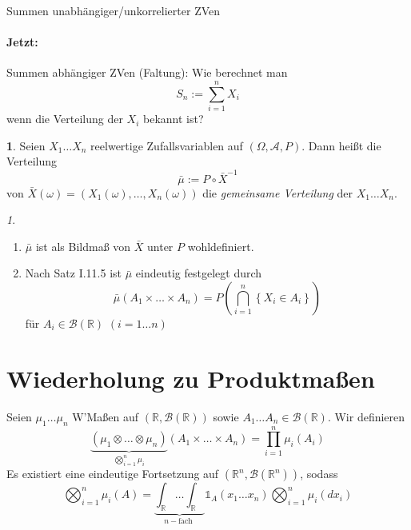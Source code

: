 \documentclass[10pt,a4paper]{report}
\numberwithin{equation}{section}
\numberwithin{figure}{section}
\theoremstyle{plain}
\theoremstyle{definition}
\newtheorem{defn}{\protect\definitionname}[section]
\theoremstyle{plain}
\theoremstyle{definition}
\theoremstyle{remark}
\newtheorem{rem}{\protect\remarkname}[section]
\theoremstyle{plain}
\theoremstyle{plain}
\theoremstyle{plain}
\theoremstyle{plain}
\theoremstyle{plain}
\providecommand{\definitionname}{Definition}
\providecommand{\remarkname}{Bemerkung}
\newcommand{\1}{ \mathbb{1} } %
\begin{document}
Summen unabhängiger/unkorrelierter ZVen


\paragraph*{Jetzt:}

Summen abhängiger ZVen (Faltung): Wie berechnet man 
\[
S_{n}:=\sum_{i=1}^{n}X_{i}
\]
wenn die Verteilung der $X_{i}$ bekannt ist?
\begin{defn}
Seien $X_{1}\ldots X_{n}$ reelwertige Zufallsvariablen auf $\left(\Omega,\mathcal{A},P\right)$.
Dann heißt die Verteilung 
\[
\bar{\mu}:=P\circ\bar{X}^{-1}
\]
von $\bar{X}\left(\omega\right)=\left(X_{1}\left(\omega\right),\ldots,X_{n}\left(\omega\right)\right)$
die \emph{gemeinsame Verteilung} der
$X_{1}\ldots X_{n}$.\end{defn}
\begin{rem}
 \ 
\begin{enumerate}
\item $\bar{\mu}$ ist als Bildmaß von $\bar{X}$ unter $P$ wohldefiniert.
\item Nach Satz I.11.5 ist $\bar{\mu}$ eindeutig festgelegt durch
\[
\bar{\mu}\left(A_{1}\times\ldots\times A_{n}\right)=P\left(\bigcap_{i=1}^{n}\left\{ X_{i}\in A_{i}\right\} \right)
\]
für $A_{i}\in\mathcal{B}\left(\mathbb{R}\right)$ $\left(i=1\ldots n\right)$ 
\end{enumerate}
\end{rem}

\section*{Wiederholung zu Produktmaßen}

Seien $\mu_{1}\ldots\mu_{n}$ W'Maßen auf $\left(\mathbb{R},\mathcal{B}\left(\mathbb{R}\right)\right)$
sowie $A_{1}\ldots A_{n}\in\mathcal{B}\left(\mathbb{R}\right)$. Wir
definieren 
\[
\underset{\bigotimes_{i=1}^{n}\mu_{i}}{\underbrace{\left(\mu_{1}\otimes\ldots\otimes\mu_{n}\right)}}\left(A_{1}\times\ldots\times A_{n}\right)=\prod_{i=1}^{n}\mu_{i}\left(A_{i}\right)
\]
Es existiert eine eindeutige Fortsetzung auf $\left(\mathbb{R}^{n},\mathcal{B}\left(\mathbb{R}^{n}\right)\right)$,
sodass 
\[
\bigotimes_{i=1}^{n}\mu_{i}\left(A\right)=\underset{n-\text{fach }}{\underbrace{\int_{\mathbb{R}}\ldots\int_{\mathbb{R}}}}\1_{A}\left(x_{1}\ldots x_{n}\right)\bigotimes_{i=1}^{n}\mu_{i}\left(dx_{i}\right)
\]
\end{document}
